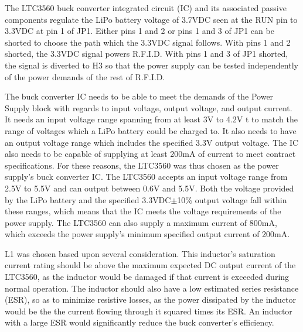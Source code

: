 The LTC3560 buck converter integrated circuit (IC) and its associated passive components regulate the LiPo battery voltage of 3.7VDC seen at the RUN pin to 3.3VDC at pin 1 of JP1. Either pins 1 and 2 or pins 1 and 3 of JP1 can be shorted to choose the path which the 3.3VDC signal follows. With pins 1 and 2 shorted, the 3.3VDC signal powers R.F.I.D. With pins 1 and 3 of JP1 shorted, the signal is diverted to H3 so that the power supply can be tested independently of the power demands of the rest of R.F.I.D. 

The buck converter IC needs to be able to meet the demands of the Power Supply block with regards to input voltage, output voltage, and output current. It needs an input voltage range spanning from at least 3V to 4.2V t to match the range of voltages which a LiPo battery could be charged to. It also needs to have an output voltage range which includes the specified 3.3V output voltage. The IC also needs to be capable of supplying at least 200mA of current to meet contract specifications. For these reasons, the LTC3560 was thus chosen as the power supply's buck converter IC. The LTC3560 accepts an input voltage range from 2.5V to 5.5V and can output between 0.6V and 5.5V. Both the voltage provided by the LiPo battery and the specified 3.3VDC$\pm$10\% output voltage fall within these ranges, which means that the IC meets the voltage requirements of the power supply. The LTC3560 can also supply a maximum current of 800mA, which exceeds the power supply's minimum specified output current of 200mA.


L1 was chosen based upon several consideration. This inductor's saturation current rating should be above the maximum expected DC output current of the LTC3560, as the inductor would be damaged if that current is exceeded during normal operation. The inductor should also have a low estimated series resistance (ESR), so as to minimize resistive losses, as the power dissipated by the inductor would be the the current flowing through it squared times its ESR. An inductor with a large ESR would significantly reduce the buck converter's efficiency.

